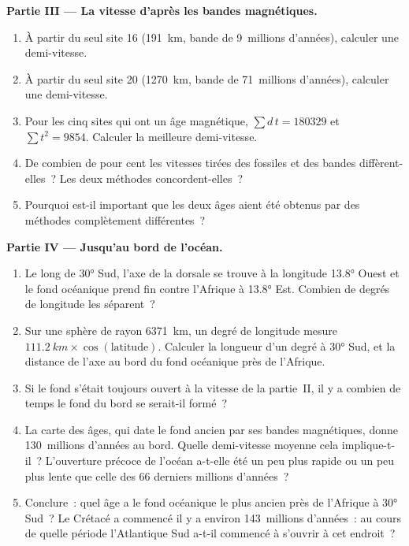 \begin{problem}
\medskip
\noindent\textbf{Partie III --- La vitesse d'après les bandes magnétiques.}
\begin{enumerate}[resume]
  \item À partir du seul site 16 (\qty{191}{km}, bande de 9~millions
        d'années), calculer une demi-vitesse.
  \item À partir du seul site 20 (\qty{1270}{km}, bande de 71~millions
        d'années), calculer une demi-vitesse.
  \item Pour les cinq sites qui ont un âge magnétique,
        $\sum d\,t = \num{180329}$ et
        $\sum t^2 = \num{9854}$. Calculer la meilleure demi-vitesse.
  \item De combien de pour cent les vitesses tirées des fossiles et des
        bandes diffèrent-elles~? Les deux méthodes concordent-elles~?
  \item Pourquoi est-il important que les deux âges aient été obtenus par
        des méthodes complètement différentes~?
\end{enumerate}

\medskip
\noindent\textbf{Partie IV --- Jusqu'au bord de l'océan.}
\begin{enumerate}[resume]
  \item Le long de \ang{30} Sud, l'axe de la dorsale se trouve à la
        longitude \ang{13.8} Ouest et le fond océanique prend fin contre
        l'Afrique à \ang{13.8} Est. Combien de degrés de longitude les
        séparent~?
  \item Sur une sphère de rayon \qty{6371}{km}, un degré de longitude
        mesure $\qty{111.2}{km} \times \cos(\text{latitude})$. Calculer la
        longueur d'un degré à \ang{30} Sud, et la distance de l'axe au bord
        du fond océanique près de l'Afrique.
  \item Si le fond s'était toujours ouvert à la vitesse de la partie~II,
        il y a combien de temps le fond du bord se serait-il formé~?
  \item La carte des âges, qui date le fond ancien par ses bandes
        magnétiques, donne \num{130}~millions d'années au bord. Quelle
        demi-vitesse moyenne cela implique-t-il~? L'ouverture précoce de
        l'océan a-t-elle été un peu plus rapide ou un peu plus lente que
        celle des 66 derniers millions d'années~?
  \item Conclure~: quel âge a le fond océanique le plus ancien près de
        l'Afrique à \ang{30} Sud~? Le Crétacé a commencé il y a environ
        \num{143}~millions d'années~: au cours de quelle période
        l'Atlantique Sud a-t-il commencé à s'ouvrir à cet endroit~?
\end{enumerate}
\end{problem}
